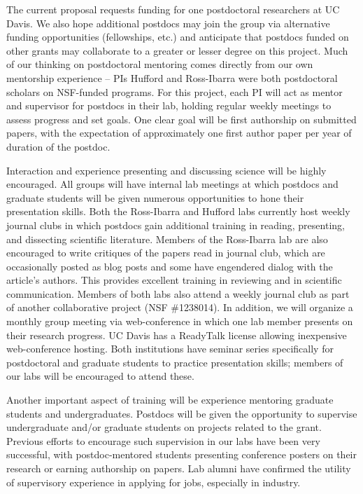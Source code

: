 The current proposal requests funding for one postdoctoral researchers at UC Davis. We also hope additional postdocs may join the group via alternative funding opportunities (fellowships, etc.) and anticipate that postdocs funded on other grants may collaborate to a greater or lesser degree on this project.  Much of our thinking on postdoctoral mentoring comes directly from our own mentorship experience -- PIs Hufford and Ross-Ibarra were both postdoctoral scholars on NSF-funded programs. For this project, each PI will act as mentor and supervisor for postdocs in their lab, holding regular weekly meetings to assess progress and set goals.  One clear goal will be first authorship on submitted papers, with the expectation of approximately one first author paper per year of duration of the postdoc. 

Interaction and experience presenting and discussing science will be highly encouraged. All groups will have internal lab meetings at which postdocs and graduate students will be given numerous opportunities to hone their presentation skills.  Both the Ross-Ibarra and Hufford labs currently host weekly journal clubs in which postdocs gain additional training in reading, presenting, and dissecting scientific literature. Members of the Ross-Ibarra lab are also encouraged to write critiques of the papers read in journal club, which are occasionally posted as blog posts and some have engendered dialog with the article's authors.  This provides excellent training in reviewing and in scientific communication.  Members of both labs also attend a weekly journal club as part of another collaborative project (NSF \#1238014). In addition, we will organize a monthly group meeting via web-conference in which one lab member presents on their research progress.  UC Davis has a ReadyTalk license allowing inexpensive web-conference hosting. Both institutions have seminar series specifically for postdoctoral and graduate students to practice presentation skills; members of our labs will be encouraged to attend these.

Another important aspect of training will be experience mentoring graduate students and undergraduates.  Postdocs will be given the opportunity to supervise undergraduate and/or graduate students on projects related to the grant.  Previous efforts to encourage such supervision in our labs have been very successful, with postdoc-mentored students presenting conference posters on their research or earning authorship on papers.  Lab alumni have confirmed the utility of supervisory experience in applying for jobs, especially in industry.

